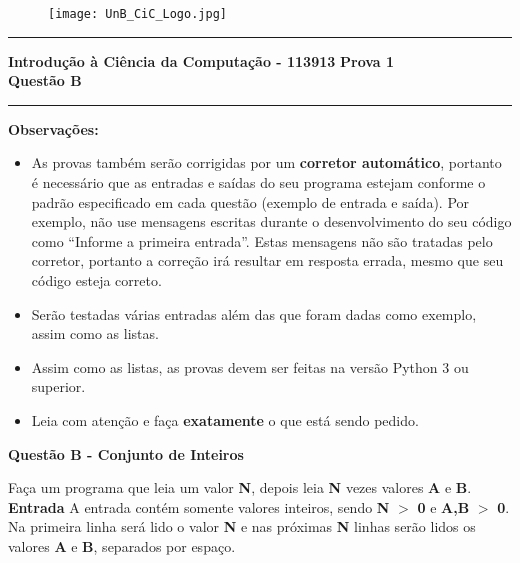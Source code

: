 \documentclass[a4paper, 12pt]{article}
\begin{document}
\begin{figure}[H]
	\texttt{[image: UnB\_CiC\_Logo.jpg]}
\end{figure}
\noindent\rule{\textwidth}{0.4pt}
\begin{center}
	\textbf{{\Large Introdução à Ciência da Computação - 113913}} \newline \newline
	\textbf{{\large Prova 1} \\
	\vspace{9pt}
	{\large Questão B}} \\
	\noindent\rule{\textwidth}{0.4pt}
	\newline
\end{center}

\textbf{{\large Observações:}}
\begin{itemize}
	\item As provas também serão corrigidas por um \textbf{corretor automático}, portanto é necessário que as entradas e saídas do seu programa estejam conforme o padrão especificado em cada questão (exemplo de entrada e saída). Por exemplo, não use mensagens escritas durante o desenvolvimento do seu código como “Informe a primeira entrada”. Estas mensagens não são tratadas pelo corretor, portanto a correção irá resultar em resposta errada, mesmo que seu código esteja correto.
	\item Serão testadas várias entradas além das que foram dadas como exemplo, assim como as listas.
	\item Assim como as listas, as provas devem ser feitas na versão Python 3 ou superior.
	\item Leia com atenção e faça \textbf{exatamente} o que está sendo pedido.
\end{itemize}
\newpage %
\begin{center}
\textbf{{\Large Questão B - Conjunto de Inteiros}}
\end{center}
\vspace{5pt}
Faça um programa que leia um valor \textbf{N}, depois leia \textbf{N} vezes valores \textbf{A} e \textbf{B}.
\newline \newline
\textbf{{\large Entrada}} \newline
A entrada contém somente valores inteiros, sendo \textbf{N} $>$ \textbf{0} e \textbf{A,B} $>$ \textbf{0}. Na primeira linha será lido o valor \textbf{N} e nas próximas \textbf{N} linhas serão lidos os valores \textbf{A} e \textbf{B}, separados por espaço.
\newline \newline
\end{document}
